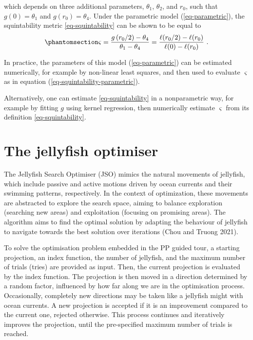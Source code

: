 \documentclass[
  12pt,
]{interact}
\theoremstyle{plain}
\begin{document}
which depends on three additional parameters, \(\theta_1\),
\(\theta_2\), and \(r_0\), such that \(g(0)=\theta_1\) and
\(g(r_0)=\theta_4\). Under the parametric model (\ref{eq-parametric}),
the squintability metric \eqref{eq-squintability} can be shown to be
equal to
\begin{equation}\phantomsection\label{eq-squintability-parametric}{
\varsigma=\frac{g\left(r_{0}/2\right)-\theta_{4}}{\theta_{1}-\theta_{4}}=\frac{\ell(r_0/2)-\ell(r_0)}{\ell(0)-\ell(r_0)}\ .
}\end{equation}

In practice, the parameters of this model (\ref{eq-parametric}) can be
estimated numerically, for example by non-linear least squares, and then
used to evaluate \(\varsigma\) as in equation
(\ref{eq-squintability-parametric}).

Alternatively, one can estimate \eqref{eq-squintability} in a
nonparametric way, for example by fitting \(g\) using kernel regression,
then numerically estimate \(\varsigma\) from its definition
\eqref{eq-squintability}.

\section{The jellyfish optimiser}\label{sec-JSO}

The Jellyfish Search Optimiser (JSO) mimics the natural movements of
jellyfish, which include passive and active motions driven by ocean
currents and their swimming patterns, respectively. In the context of
optimization, these movements are abstracted to explore the search
space, aiming to balance exploration (searching new areas) and
exploitation (focusing on promising areas). The algorithm aims to find
the optimal solution by adapting the behaviour of jellyfish to navigate
towards the best solution over iterations (Chou and Truong 2021).

To solve the optimisation problem embedded in the PP guided tour, a
starting projection, an index function, the number of jellyfish, and the
maximum number of trials (tries) are provided as input. Then, the
current projection is evaluated by the index function. The projection is
then moved in a direction determined by a random factor, influenced by
how far along we are in the optimisation process. Occasionally,
completely new directions may be taken like a jellyfish might with ocean
currents. A new projection is accepted if it is an improvement compared
to the current one, rejected otherwise. This process continues and
iteratively improves the projection, until the pre-specified maximum
number of trials is reached.
\end{document}

